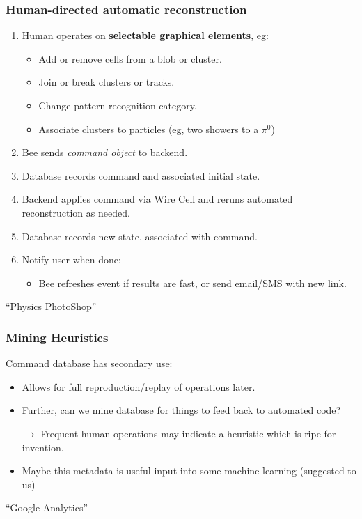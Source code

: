 \documentclass[xcolor=dvipsnames]{beamer}
\begin{document}
\begin{frame} 
  \frametitle{Human-directed automatic reconstruction}
  \begin{enumerate}
  \item Human operates on \textbf{selectable graphical elements}, eg:
    \begin{itemize}\footnotesize
    \item Add or remove cells from a blob or cluster.
    \item Join or break clusters or tracks.
    \item Change pattern recognition category.
    \item Associate clusters to particles (eg, two showers to a $\pi^0$)
    \end{itemize}
  \item Bee sends \textit{command object} to backend.
  \item Database records command and associated initial state.
  \item Backend applies command via Wire Cell and reruns automated reconstruction as needed.
  \item Database records new state, associated with command.
  \item Notify user when done:
    \begin{itemize}\footnotesize
    \item Bee refreshes event if results are fast, or send email/SMS
      with new link.
    \end{itemize}
  \end{enumerate}
  ``Physics PhotoShop''
\end{frame}

\begin{frame}
  \frametitle{Mining Heuristics}
  
  Command database has secondary use:
  \begin{itemize}\footnotesize
  \item Allows for full reproduction/replay of operations later.
  \item Further, can we mine database for things to feed back to automated code?
  \item[$\rightarrow$] Frequent human operations may indicate a heuristic which is ripe for invention.
  \item Maybe this metadata is useful input into some machine learning (suggested to us)
  \end{itemize}

  \vfill

  ``Google Analytics''
\end{frame}
\end{document}
